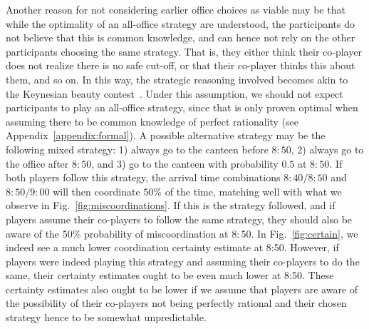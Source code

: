 \documentclass[twocolumn,a4paper,superscriptaddress,nofootinbib]{revtex4}
\begin{document}
Another reason for not considering earlier office choices as viable may be that while the optimality of an all-office strategy are understood, the participants do not believe that this is common knowledge, and can hence not rely on the other participants choosing the same strategy. That is, they either think their co-player does not realize there is no safe cut-off, or that their co-player thinks this about them, and so on. In this way, the strategic reasoning involved becomes akin to the Keynesian beauty contest~\cite{keynes1936general,nagel1995unraveling}. Under this assumption, we should not expect participants to play an all-office strategy, since that is only proven optimal when assuming there to be common knowledge of perfect rationality (see Appendix~\ref{appendix:formal}). A possible alternative strategy may be the following mixed strategy: 1) always go to the canteen before $8{:}50$, 2) always go to the office after $8{:}50$, and 3) go to the canteen with probability $0.5$ at $8{:}50$. If both players follow this strategy, the arrival time combinations $8{:}40/8{:}50$ and $8{:}50/9{:}00$ will then coordinate $50\%$ of the time, matching well with what we observe in Fig.~\ref{fig:miscoordinations}. If this is the strategy followed, and if players assume their co-players to follow the same strategy, they should also be aware of the $50\%$ probability of miscoordination at $8{:}50$. In Fig.~\ref{fig:certain}, we indeed see a much lower coordination certainty estimate at 8:50. However, if players were indeed playing this strategy and assuming their co-players to do the same, their certainty estimates ought to be even much lower at 8{:}50. %
 These certainty estimates also ought to be lower if we assume that players are aware of the possibility of their co-players not being perfectly rational and their chosen strategy hence to be somewhat unpredictable. 
\end{document}
